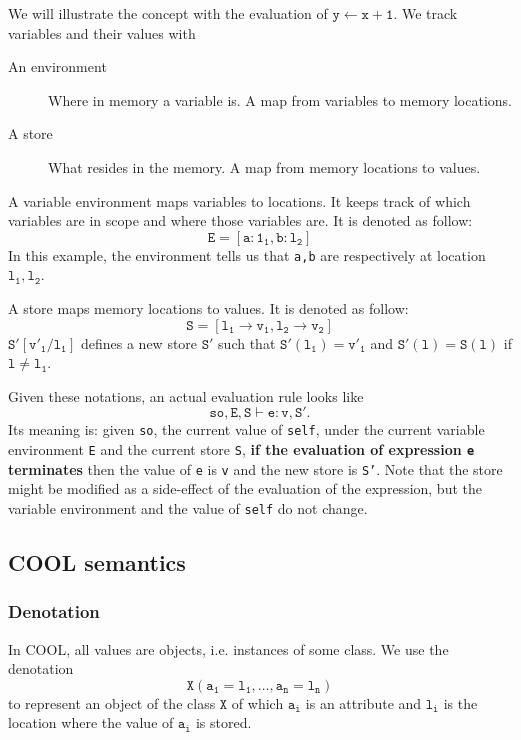 We will illustrate the concept with the evaluation of $\mathtt{y\leftarrow x + 1}$. We track variables and their values with 
\begin{description}
\item[An environment]Where in memory a variable is. A map from variables to memory locations.
\item[A store]What resides in the memory. A map from memory locations to values.
\end{description}
A variable environment maps variables to locations. It keeps track of which variables are in scope and where those variables are. It is denoted as follow:
\begin{equation*}
\mathtt{E = [a:1_1, b:l_2]}
\end{equation*}
In this example, the environment tells us that \texttt{a,b} are respectively at location $\mathtt{l_1,l_2}$.

A store maps memory locations to values. It is denoted as follow:
\begin{equation*}
\mathtt{S = [l_1\rightarrow v_1, l_2\rightarrow v_2]}
\end{equation*}
$\mathtt{S'[v'_1/l_1]}$ defines a new store $\mathtt{S'}$ such that $\mathtt{S'(l_1)=v'_1}$ and $\mathtt{S'(l)=S(l)}$ if $\mathtt{l\neq l_1}$.

Given these notations, an actual evaluation rule looks like 
\begin{equation*}
\mathtt{so,E,S\vdash e:v,S'}.
\end{equation*}
Its meaning is: given \texttt{so}, the current value of \texttt{self}, under the current variable environment \texttt{E} and the current store \texttt{S}, \textbf{if the evaluation of expression \texttt{e} terminates} then the value of \texttt{e} is \texttt{v} and the new store is \texttt{S'}. Note that the store might be modified as a side-effect of the evaluation of the expression, but the variable environment and the value of \texttt{self} do not change.

\subsection{COOL semantics}
\subsubsection{Denotation}
In COOL, all values are objects, i.e. instances of some class. We use the denotation
\begin{equation*}
\mathtt{X(a_1=l_1,\dots,a_n=l_n)}
\end{equation*}
to represent an object of the class $\mathtt{X}$ of which $\mathtt{a_i}$ is an attribute and $\mathtt{l_i}$ is the location where the value of $\mathtt{a_i}$ is stored. 

